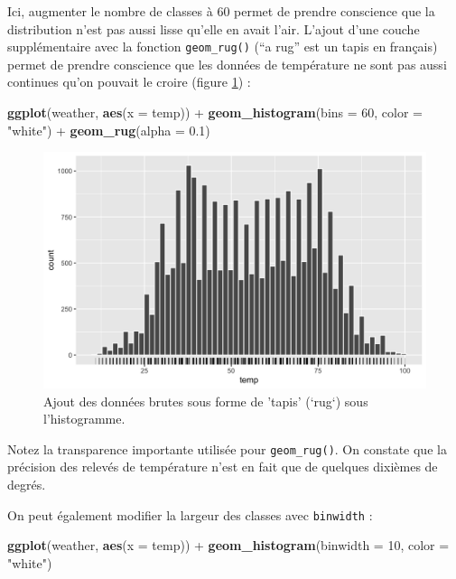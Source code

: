 \documentclass[a4paperpaper,]{article}
\newenvironment{Shaded}{\begin{snugshade}}{\end{snugshade}}
\newcommand{\DataTypeTok}[1]{\textcolor[rgb]{0.00,0.34,0.68}{#1}}
\newcommand{\DecValTok}[1]{\textcolor[rgb]{0.69,0.50,0.00}{#1}}
\newcommand{\FloatTok}[1]{\textcolor[rgb]{0.69,0.50,0.00}{#1}}
\newcommand{\KeywordTok}[1]{\textcolor[rgb]{0.12,0.11,0.11}{\textbf{#1}}}
\newcommand{\NormalTok}[1]{\textcolor[rgb]{0.12,0.11,0.11}{#1}}
\newcommand{\OperatorTok}[1]{\textcolor[rgb]{0.12,0.11,0.11}{#1}}
\newcommand{\StringTok}[1]{\textcolor[rgb]{0.75,0.01,0.01}{#1}}
\begin{document}
Ici, augmenter le nombre de classes à 60 permet de prendre conscience que la distribution n'est pas aussi lisse qu'elle en avait l'air. L'ajout d'une couche supplémentaire avec la fonction \texttt{geom\_rug()} (``a rug'' est un tapis en français) permet de prendre conscience que les données de température ne sont pas aussi continues qu'on pouvait le croire (figure \ref{fig:rughist}) :

\begin{Shaded}
\begin{Highlighting}[]
\KeywordTok{ggplot}\NormalTok{(weather, }\KeywordTok{aes}\NormalTok{(}\DataTypeTok{x =}\NormalTok{ temp)) }\OperatorTok{+}
\StringTok{  }\KeywordTok{geom_histogram}\NormalTok{(}\DataTypeTok{bins =} \DecValTok{60}\NormalTok{, }\DataTypeTok{color =} \StringTok{"white"}\NormalTok{) }\OperatorTok{+}
\StringTok{  }\KeywordTok{geom_rug}\NormalTok{(}\DataTypeTok{alpha =} \FloatTok{0.1}\NormalTok{)}
\end{Highlighting}
\end{Shaded}

\begin{figure}[htpb]

{\centering \includegraphics[width=0.9\linewidth]{figure/rughist-1} 

}

\caption{Ajout des données brutes sous forme de 'tapis' (`rug`) sous l'histogramme.}\label{fig:rughist}
\end{figure}

Notez la transparence importante utilisée pour \texttt{geom\_rug()}. On constate que la précision des relevés de température n'est en fait que de quelques dixièmes de degrés.

On peut également modifier la largeur des classes avec \texttt{binwidth} :

\begin{Shaded}
\begin{Highlighting}[]
\KeywordTok{ggplot}\NormalTok{(weather, }\KeywordTok{aes}\NormalTok{(}\DataTypeTok{x =}\NormalTok{ temp)) }\OperatorTok{+}
\StringTok{  }\KeywordTok{geom_histogram}\NormalTok{(}\DataTypeTok{binwidth =} \DecValTok{10}\NormalTok{, }\DataTypeTok{color =} \StringTok{"white"}\NormalTok{)}
\end{Highlighting}
\end{Shaded}
\end{document}
